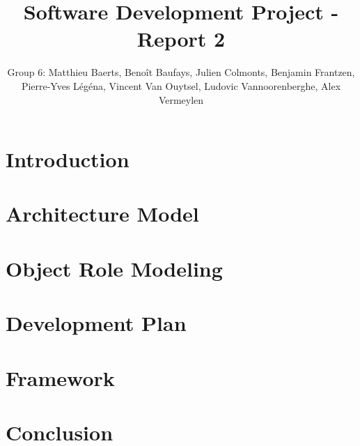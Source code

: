 \documentclass[11pt,a4paper]{article}
\title{Software Development Project - Report 2}
\author{Group 6: Matthieu Baerts, Benoît Baufays, Julien Colmonts, Benjamin Frantzen, Pierre-Yves Légéna, Vincent Van Ouytsel, Ludovic Vannoorenberghe, Alex Vermeylen}
\begin{document}


\tableofcontents
\newpage

\section*{Introduction}


\newpage

\section{Architecture Model}

\newpage

\section{Object Role Modeling}

\newpage

\section{Development Plan}

\newpage

\section{Framework}

\newpage
%

\newpage
\section*{Conclusion}



\newpage

\appendix

\end{document}
